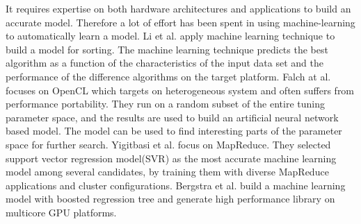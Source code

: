 It requires expertise on both hardware architectures and applications to build an accurate model. Therefore a lot of 
effort has been spent in using machine-learning to automatically learn a model. Li et al.\cite{li2004dynamically} apply machine learning 
technique to build a model for sorting. The machine learning technique predicts the best algorithm as a function of the 
characteristics of the input data set and the performance of the difference algorithms on the target platform. Falch at al.\cite{falch2015machine}
focuses on OpenCL which targets on heterogeneous system and often suffers from performance portability. They run on a random
subset of the entire tuning parameter space, and the results are used to build an artificial neural network based model. 
The model can be used to find interesting parts of the parameter space for further search. Yigitbasi et al.\cite{yigitbasi2013towards} focus on MapReduce.
They selected support vector regression model(SVR) as the most accurate machine learning model among several candidates, by 
training them with diverse MapReduce applications and cluster configurations. Bergstra et al.\cite{bergstra2012machine} build a machine learning model
with boosted regression tree and generate high performance library on multicore GPU platforms.




